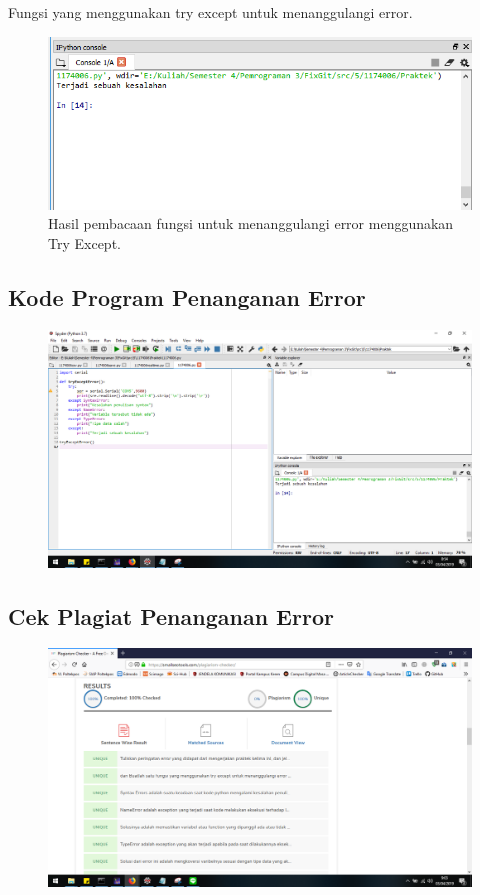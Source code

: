 \hfill \break
Fungsi yang menggunakan try except untuk menanggulangi error.



\begin{figure}[H]
	\includegraphics[width=12cm]{figures/5/1174031/Praktek/5.png}
	\centering
	\caption{Hasil pembacaan fungsi untuk menanggulangi error menggunakan Try Except.}
\end{figure}

\subsection{Kode Program Penanganan Error}
\begin{figure}[H]
	\includegraphics[width=12cm]{figures/5/1174031/Praktek/error.png}
	\centering
\end{figure}

\subsection{Cek Plagiat Penanganan Error}
\begin{figure}[H]
	\includegraphics[width=12cm]{figures/5/1174031/Praktek/plagiaterror.png}
	\centering
\end{figure}
